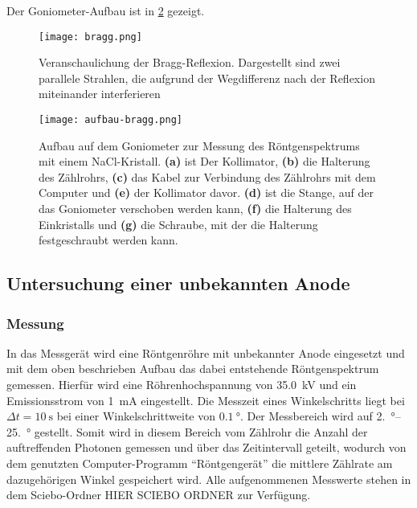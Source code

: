 Der Goniometer-Aufbau ist in \cref{fig:aufbau-bragg} gezeigt.

\begin{figure}[htb]
	\centering
	\texttt{[image: bragg.png]}
	\caption{Veranschaulichung der Bragg-Reflexion. Dargestellt sind zwei parallele Strahlen,
		die aufgrund der Wegdifferenz nach der Reflexion miteinander interferieren}
	\label{fig:bragg}
\end{figure}

\newcommand\ebf[1]{\textbf{(#1)}}
\begin{figure}[htb]
	\centering
	\texttt{[image: aufbau-bragg.png]}
	\caption{Aufbau auf dem Goniometer zur Messung des Röntgenspektrums mit einem NaCl-Kristall. \ebf a ist 
	Der Kollimator, \ebf b die Halterung des Zählrohrs, \ebf c das Kabel zur Verbindung des Zählrohrs mit 
	dem Computer und \ebf e der Kollimator davor. \ebf d ist die Stange, auf der das Goniometer verschoben
	werden kann, \ebf f die Halterung des Einkristalls und \ebf g die Schraube, mit der die Halterung 
	festgeschraubt werden kann.}
	\label{fig:aufbau-bragg}
\end{figure}

\subsection{Untersuchung einer unbekannten Anode}\label{sec:unbekannte_anode}
\subsubsection{Messung}
In das Messgerät wird eine Röntgenröhre mit unbekannter Anode eingesetzt und mit dem oben beschrieben Aufbau
das dabei entstehende Röntgenspektrum gemessen. Hierfür wird eine Röhrenhochspannung von \SI{35.0}{\kilo\volt} und
ein Emissionsstrom von \SI{1}{\milli\ampere} eingestellt. Die Messzeit eines Winkelschritts liegt bei
$\Delta t = \SI{10}{\second}$
bei einer Winkelschrittweite von $\SI{0.1}{\degree}$. Der Messbereich wird auf \qtyrange{2.}{25.}{\degree} gestellt.
Somit wird in diesem Bereich vom Zählrohr die Anzahl der auftreffenden Photonen gemessen
und über das Zeitintervall geteilt, wodurch von dem genutzten Computer-Programm
\enquote{Röntgengerät} die mittlere Zählrate am dazugehörigen Winkel gespeichert wird. Alle
aufgenommenen Messwerte stehen in dem Sciebo-Ordner HIER SCIEBO ORDNER
zur Verfügung.

